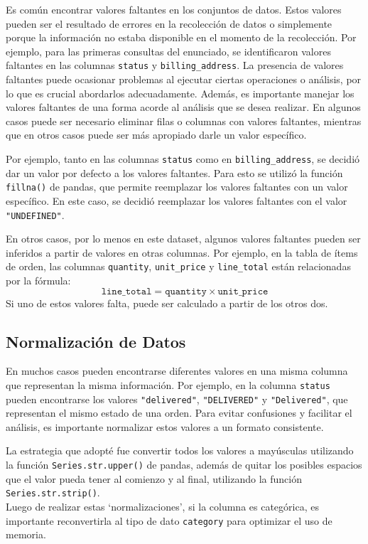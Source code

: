 Es común encontrar valores faltantes en los conjuntos de datos. Estos valores pueden ser el resultado de errores en la recolección de datos o simplemente porque la información no estaba disponible en el momento de la recolección. Por ejemplo, para las primeras consultas del enunciado, se identificaron valores faltantes en las columnas \texttt{status} y \texttt{billing\_address}.
La presencia de valores faltantes puede ocasionar problemas al ejecutar ciertas operaciones o análisis, por lo que es crucial abordarlos adecuadamente.
Además, es importante manejar los valores faltantes de una forma acorde al análisis que se desea realizar. En algunos casos puede ser necesario eliminar filas o columnas con valores faltantes, mientras que en otros casos puede ser más apropiado darle un valor específico.

Por ejemplo, tanto en las columnas \texttt{status} como en \texttt{billing\_address}, se decidió dar un valor por defecto a los valores faltantes. Para esto se utilizó la función \texttt{fillna()} de pandas, que permite reemplazar los valores faltantes con un valor específico. En este caso, se decidió reemplazar los valores faltantes con el valor \texttt{"UNDEFINED"}.

En otros casos, por lo menos en este dataset, algunos valores faltantes pueden ser inferidos a partir de valores en otras columnas. Por ejemplo, en la tabla de ítems de orden, las columnas \texttt{quantity}, \texttt{unit\_price} y \texttt{line\_total} están relacionadas por la fórmula:
\[\texttt{line\_total} = \texttt{quantity} \times \texttt{unit\_price}\] \label{datos:order_items_quantity}
Si uno de estos valores falta, puede ser calculado a partir de los otros dos.

\subsection{Normalización de Datos}

En muchos casos pueden encontrarse diferentes valores en una misma columna que representan la misma información. Por ejemplo, en la columna \texttt{status} pueden encontrarse los valores \texttt{"delivered"}, \texttt{"DELIVERED"} y \texttt{"Delivered"}, que representan el mismo estado de una orden. Para evitar confusiones y facilitar el análisis, es importante normalizar estos valores a un formato consistente.

La estrategia que adopté fue convertir todos los valores a mayúsculas utilizando la función \texttt{Series.str.upper()} de pandas, además de quitar los posibles espacios que el valor pueda tener al comienzo y al final, utilizando la función \texttt{Series.str.strip()}. \\
Luego de realizar estas `normalizaciones', si la columna es categórica, es importante reconvertirla al tipo de dato \texttt{category} para optimizar el uso de memoria.